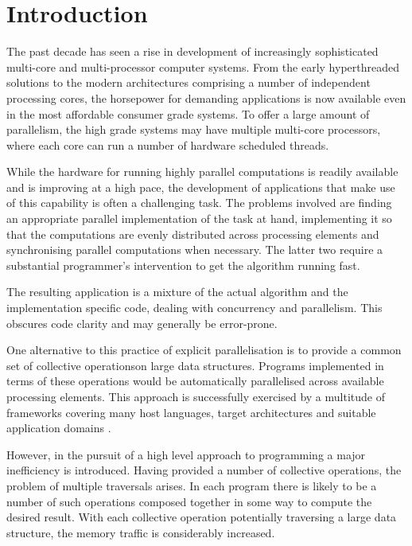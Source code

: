 \documentclass[preamble.tex]{subfiles}
\begin{document}
\clearpage

\chapter{Introduction}
\label{ch:introduction}

The past decade has seen a rise in development of increasingly sophisticated multi-core and multi-processor computer systems. From the early hyperthreaded solutions to the modern architectures comprising a number of independent processing cores, the horsepower for demanding applications is now available even in the most affordable consumer grade systems. To offer a large amount of parallelism, the high grade systems may have multiple multi-core processors, where each core can run a number of hardware scheduled threads.

While the hardware for running highly parallel computations is readily available and is improving at a high pace, the development of applications that make use of this capability is often a challenging task. The problems involved are finding an appropriate parallel implementation of the task at hand, implementing it so that the computations are evenly distributed across processing elements and synchronising parallel computations when necessary. The latter two require a substantial programmer's intervention to get the algorithm running fast.


The resulting application is a mixture of the actual algorithm and the implementation specific code, dealing with concurrency and parallelism. This obscures code clarity and may generally be error-prone.

One alternative to this practice of explicit parallelisation is to provide a common set of collective operations\icollop on large data structures. Programs implemented in terms of these operations would be automatically parallelised across available processing elements. This approach is successfully exercised by a multitude of frameworks covering many host languages, target architectures and suitable application domains \cite{PLKC08,KCL+10,CKL+11,AS07}. 

However, in the pursuit of a high level approach to programming a major inefficiency is introduced. Having provided a number of collective operations, the problem of multiple traversals arises. In each program there is likely to be a number of such operations composed together in some way to compute the desired result. With each collective operation potentially traversing a large data structure, the memory traffic is considerably increased.
\end{document}
